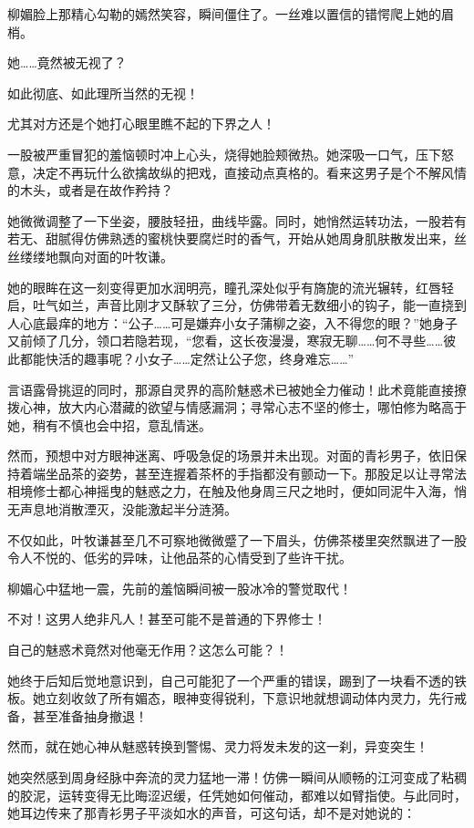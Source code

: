柳媚脸上那精心勾勒的嫣然笑容，瞬间僵住了。一丝难以置信的错愕爬上她的眉梢。

她……竟然被无视了？

如此彻底、如此理所当然的无视！

尤其对方还是个她打心眼里瞧不起的下界之人！

一股被严重冒犯的羞恼顿时冲上心头，烧得她脸颊微热。她深吸一口气，压下怒意，决定不再玩什么欲擒故纵的把戏，直接动点真格的。看来这男子是个不解风情的木头，或者是在故作矜持？

她微微调整了一下坐姿，腰肢轻扭，曲线毕露。同时，她悄然运转功法，一股若有若无、甜腻得仿佛熟透的蜜桃快要腐烂时的香气，开始从她周身肌肤散发出来，丝丝缕缕地飘向对面的叶牧谦。

她的眼眸在这一刻变得更加水润明亮，瞳孔深处似乎有旖旎的流光辗转，红唇轻启，吐气如兰，声音比刚才又酥软了三分，仿佛带着无数细小的钩子，能一直挠到人心底最痒的地方：“公子……可是嫌弃小女子蒲柳之姿，入不得您的眼？”她身子又前倾了几分，领口若隐若现，“您看，这长夜漫漫，寒寂无聊……何不寻些……彼此都能快活的趣事呢？小女子……定然让公子您，终身难忘……”

言语露骨挑逗的同时，那源自灵界的高阶魅惑术已被她全力催动！此术竟能直接撩拨心神，放大内心潜藏的欲望与情感漏洞；寻常心志不坚的修士，哪怕修为略高于她，稍有不慎也会中招，意乱情迷。

然而，预想中对方眼神迷离、呼吸急促的场景并未出现。对面的青衫男子，依旧保持着端坐品茶的姿势，甚至连握着茶杯的手指都没有颤动一下。那股足以让寻常法相境修士都心神摇曳的魅惑之力，在触及他身周三尺之地时，便如同泥牛入海，悄无声息地消散湮灭，没能激起半分涟漪。

不仅如此，叶牧谦甚至几不可察地微微蹙了一下眉头，仿佛茶楼里突然飘进了一股令人不悦的、低劣的异味，让他品茶的心情受到了些许干扰。

柳媚心中猛地一震，先前的羞恼瞬间被一股冰冷的警觉取代！

不对！这男人绝非凡人！甚至可能不是普通的下界修士！

自己的魅惑术竟然对他毫无作用？这怎么可能？！

她终于后知后觉地意识到，自己可能犯了一个严重的错误，踢到了一块看不透的铁板。她立刻收敛了所有媚态，眼神变得锐利，下意识地就想调动体内灵力，先行戒备，甚至准备抽身撤退！

然而，就在她心神从魅惑转换到警惕、灵力将发未发的这一刹，异变突生！

她突然感到周身经脉中奔流的灵力猛地一滞！仿佛一瞬间从顺畅的江河变成了粘稠的胶泥，运转变得无比晦涩迟缓，任凭她如何催动，都难以如臂指使。与此同时，她耳边传来了那青衫男子平淡如水的声音，可这句话，却不是对她说的：

